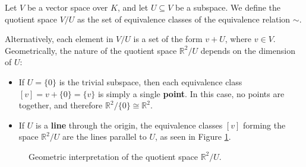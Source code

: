 \begin{definition}
  Let $V$ be a vector space over $K$, and let $U \subseteq V$ be a subspace. We define the quotient space $V/U$ as the set of equivalence classes of the equivalence relation $\sim$.
\end{definition}

Alternatively, each element in $V/U$ is a set of the form $v + U$, where $v \in V$.
\bigbreak
Geometrically, the nature of the quotient space $\mathbb{R}^2/U$ depends on the dimension of $U$:
\begin{itemize}
  \item If $U = \{0\}$ is the trivial subspace, then each equivalence class $[v] = v + \{0\} = \{v\}$ is simply a single \textbf{point}. In this case, no points are  together, and therefore $\mathbb{R}^2/\{0\} \cong \mathbb{R}^2$.
  \item If $U$ is a \textbf{line} through the origin, the equivalence classes $[v]$ forming the space $\mathbb{R}^2/U$ are the lines parallel to $U$, as seen in Figure \ref{fig:quotient_r2}.
\end{itemize}

\begin{figure}[ht!]
  \centering
  \caption{Geometric interpretation of the quotient space $\mathbb{R}^2/U$.}
  \label{fig:quotient_r2}
\end{figure}

